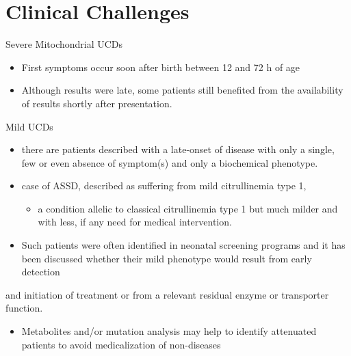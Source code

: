 \documentclass[presentation, smaller]{beamer}
\begin{document}
\section{Clinical Challenges}
\label{sec:orgheadline21}
\begin{frame}[label={sec:orgheadline19}]{Severe Mitochondrial UCDs}
\begin{itemize}
\item First symptoms occur soon after birth between 12 and 72 h of age
\item Although results were late, some patients still benefited from the availability of results shortly after presentation.
\end{itemize}
\end{frame}

\begin{frame}[label={sec:orgheadline20}]{Mild UCDs}
\begin{itemize}
\item there are patients described with a late-onset of disease with only a single, few or even absence of symptom(s) and only a biochemical phenotype.
\item case of ASSD, described as suffering from mild citrullinemia type 1,
\begin{itemize}
\item a condition allelic to classical citrullinemia type 1 but much milder and with less, if any need for medical intervention.
\end{itemize}
\item Such patients were often identified in neonatal screening programs and it has been discussed whether their mild phenotype would result from early detection
\end{itemize}
and initiation of treatment or from a relevant residual enzyme or transporter function. 
\begin{itemize}
\item Metabolites and/or mutation analysis may help to identify attenuated patients to avoid medicalization of non-diseases
\end{itemize}
\end{frame}
\end{document}

